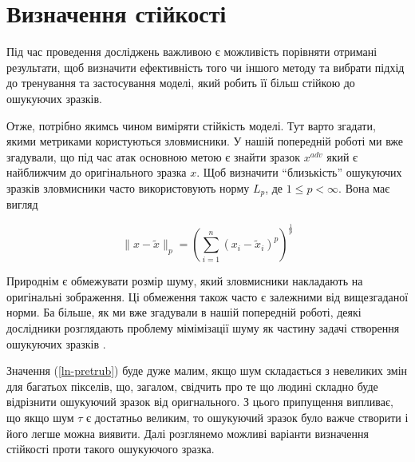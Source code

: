 \documentclass[14pt,a4paper]{extarticle}
\newcounter{e}
\numberwithin{equation}{section}
\numberwithin{figure}{section}
\begin{document}

 
 
 \newpage
 \thispagestyle{empty}
 \section{Визначення стійкості}
 \vspace{1cm}
 Під час проведення досліджень важливою є можливість порівняти отримані результати, щоб визначити ефективність того чи іншого методу та вибрати підхід до тренування та застосування моделі, який робить її більш стійкою до ошукуючих зразків.
 
 Отже, потрібно якимсь чином виміряти стійкість моделі. Тут варто згадати, якими метриками користуються зловмисники. У нашій попередній роботі \cite{my-work} ми вже згадували, що під час атак основною метою є знайти зразок $x^{adv}$ який є найближчим до оригінального зразка $x$. Щоб визначити ``близькість'' ошукуючих зразків зловмисники часто використовують норму  $L_p$, де $1 \leq p<\infty$. Вона має вигляд
 
 \begin{equation}
 \label{ln-pretrub}
 \|x-\tilde{x}\|_{p}=\left(\sum_{i=1}^{n}\left(x_{i}-\tilde{x}_{i}\right)^{p}\right)^{\frac{1}{p}}
 \end{equation}
 
 Природнім є обмежувати розмір шуму, який зловмисники накладають на оригінальні зображення. Ці обмеження також часто є залежними від вищезгаданої норми. Ба більше, як ми вже згадували в нашій попередній роботі, деякі дослідники розглядають проблему мімімізації шуму як частину задачі створення ошукуючих зразків \cite{C-and-W}.
 
 Значення (\ref{ln-pretrub}) буде дуже малим, якщо шум складається з невеликих змін для багатьох пікселів, що, загалом, свідчить про те що людині складно буде відрізнити ошукуючий зразок від оригнального. З цього припущення випливає, що якщо шум $\tau$ є достатньо великим, то ошукуючий зразок було важче створити і його легше можна виявити.
 Далі розглянемо можливі варіанти визначення стійкості проти такого ошукуючого зразка.
 
\end{document}
